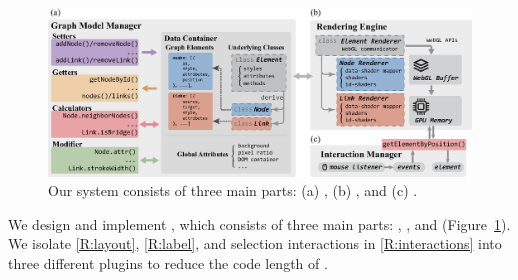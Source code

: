 \begin{figure}[htbp]
    \includegraphics[width=\linewidth]{fig/architecture.eps}
    \caption{
        Our system consists of three main parts: (a) \GraModMan, (b) \RenEng, and (c) \IntMan.
    }
    \label{fig:design}
\end{figure}


We design and implement \name, which consists of three main parts:  \GraModMan,  \RenEng, and  \IntMan (Figure~\ref{fig:design}).
We isolate \ref{R:layout}, \ref{R:label}, and selection interactions in \ref{R:interactions} into three different plugins to reduce the code length of \name.

\subsubsection{\GraModMan}

